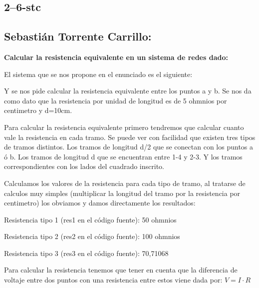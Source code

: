 \documentclass[12pt,thmsa]{article}
\begin{document}
\subsection{2--6-stc}

\subsection{Sebasti\'{a}n Torrente Carrillo:}

\vspace{1pt}\textbf{Calcular la resistencia equivalente en un sistema de
redes dado:}

El sistema que se nos propone en el enunciado es el siguiente:


Y se nos pide calcular la resistencia equivalente entre los puntos a y b. Se
nos da como dato que la resistencia por unidad de longitud es de 5 ohmnios
por centimetro y d=10cm.

Para calcular la resistencia equivalente primero tendremos que calcular
cuanto vale la resistencia en cada tramo. Se puede ver con facilidad que
existen tres tipos de tramos distintos. Los tramos de longitud d/2 que se
conectan con los puntos a \'{o} b. Los tramos de longitud d que se
encuentran entre 1-4 y 2-3. Y los tramos correspondientes con los lados del
cuadrado inscrito.

Calculamos los valores de la resistencia para cada tipo de tramo, al
tratarse de calculos muy simples (multiplicar la longitud del tramo por la
resistencia por centimetro) los obviamos y damos directamente los resultados:

Resistencia tipo 1 (res1 en el c\'{o}digo fuente): 50 ohmnios

Resistencia tipo 2 (res2 en el c\'{o}digo fuente): 100 ohmnios

Resistencia tipo 3 (res3 en el c\'{o}digo fuente): 70,71068

\vspace{1pt}

Para calcular la resistencia tenemos que tener en cuenta que la diferencia
de voltaje entre dos puntos con una resistencia entre estos viene dada por: $%
V=I\cdot R$
\end{document}
